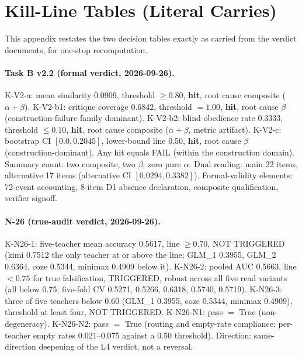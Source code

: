 \documentclass[11pt]{article}
\newcommand{\hit}{\textbf{hit}}
\begin{document}
\section{Kill-Line Tables (Literal Carries)}\label{app:kill}

This appendix restates the two decision tables exactly as carried from the verdict documents, for one-stop recomputation.

\paragraph{Task B v2.2 (formal verdict, 2026-09-26).}
K-V2-a: mean similarity 0.0909, threshold $\geq 0.80$, \hit, root cause composite ($\alpha + \beta$). K-V2-b1: critique coverage 0.6842, threshold $= 1.00$, \hit, root cause $\beta$ (construction-failure family dominant). K-V2-b2: blind-obedience rate 0.3333, threshold $\leq 0.10$, \hit, root cause composite ($\alpha + \beta$, metric artifact). K-V2-c: bootstrap CI $[0.0, 0.2045]$, lower-bound line 0.50, \hit, root cause $\beta$ (construction-dominant). Any hit equals FAIL (within the construction domain). Summary count: two composite, two $\beta$, zero pure $\alpha$. Dual reading: main 22 items, alternative 17 items (alternative CI $[0.0294, 0.3382]$). Formal-validity elements: 72-event accounting, 8-item D1 absence declaration, composite qualification, verifier signoff.

\paragraph{N-26 (true-audit verdict, 2026-09-26).}
K-N26-1: five-teacher mean accuracy 0.5617, line $\geq 0.70$, NOT TRIGGERED (kimi 0.7512 the only teacher at or above the line; GLM\_1 0.3955, GLM\_2 0.6364, coze 0.5344, minimax 0.4909 below it). K-N26-2: pooled AUC 0.5663, line $< 0.75$ for true falsification, TRIGGERED, robust across all five read variants (all below 0.75; five-fold CV 0.5271, 0.5266, 0.6318, 0.5740, 0.5719). K-N26-3: three of five teachers below 0.60 (GLM\_1 0.3955, coze 0.5344, minimax 0.4909), threshold at least four, NOT TRIGGERED. K-N26-N1: pass $=$ True (non-degeneracy). K-N26-N2: pass $=$ True (routing and empty-rate compliance; per-teacher empty rates 0.021--0.075 against a 0.50 threshold). Direction: same-direction deepening of the L4 verdict, not a reversal.
\end{document}
